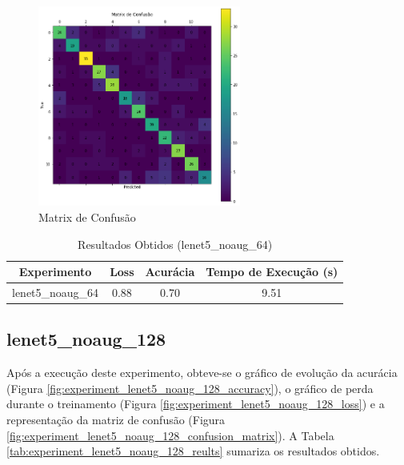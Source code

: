 \documentclass[12pt]{article}
\begin{document}
\begin{figure}[!htb]
  \centering
  \includegraphics[width=18em]{experiments/lenet5_noaug_64/confusion_matrix.png}
  \caption{Matrix de Confusão}
  \label{fig:experiment_lenet5_noaug_64_confusion_matrix}
\end{figure}

\begin{table}[!htb]
  \centering
  \begin{tabular}{|c|c|c|c|}
    \hline
    \textbf{Experimento} & \textbf{Loss} & \textbf{Acurácia} & \textbf{Tempo de Execução (s)} \\ \hline
    lenet5\_noaug\_64    & 0.88          & 0.70              & 9.51                           \\ \hline
  \end{tabular}
  \caption{Resultados Obtidos (lenet5\_noaug\_64)}
  \label{tab:experiment_lenet5_noaug_64_reults}
\end{table}

\newpage

\subsection{lenet5\_noaug\_128}

Após a execução deste experimento, obteve-se o gráfico de evolução da acurácia (Figura \ref{fig:experiment_lenet5_noaug_128_accuracy}), o gráfico de perda durante o treinamento (Figura \ref{fig:experiment_lenet5_noaug_128_loss}) e a representação da matriz de confusão (Figura \ref{fig:experiment_lenet5_noaug_128_confusion_matrix}). A Tabela \ref{tab:experiment_lenet5_noaug_128_reults} sumariza os resultados obtidos.
\end{document}
